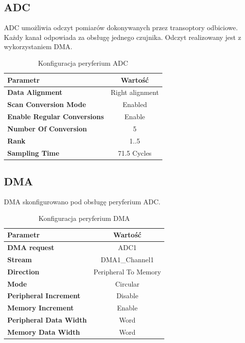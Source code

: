 \documentclass[10pt, a4paper]{article}
\begin{document}
\subsection{ADC}
\noindent ADC umożliwia odczyt pomiarów dokonywanych przez transoptory odbiciowe. Każdy kanał odpowiada za obsługę jednego czujnika. Odczyt realizowany jest z wykorzystaniem DMA.
\begin{table}[H]
	\centering
	\begin{tabular}{|l|c|} \hline
		\textbf{Parametr} & Wartość \\
		\hline
		\hline  \textbf{Data Alignment}& Right alignment\\\hline
		\textbf{Scan Conversion Mode} & Enabled\\
		\hline
		\textbf{Enable Regular Conversions} & Enable\\
		\hline
		\textbf{Number Of Conversion} & 5\\
		\hline
		\textbf{Rank} & 1..5\\
		\hline
		\textbf{Sampling Time} & 71.5 Cycles\\
		\hline
	\end{tabular}
	\caption{Konfiguracja peryferium ADC}
	\label{tab:ADC}
\end{table}
\newpage
\subsection{DMA}
\noindent DMA skonfigurowano pod obsługę peryferium ADC. 
\begin{table}[H]
	\centering
	\begin{tabular}{|l|c|} \hline
		\textbf{Parametr} & Wartość \\
		\hline
		\hline  \textbf{DMA request}& ADC1\\\hline
		\textbf{Stream} & DMA1\_Channel1\\
		\hline
		\textbf{Direction} & Peripheral To Memory\\
		\hline
		\textbf{Mode} & Circular\\
		\hline
		\textbf{Peripheral Increment} & Disable\\
		\hline
		\textbf{Memory Increment} & Enable\\
		\hline
		\textbf{Peripheral Data Width} & Word\\
		\hline
		\textbf{Memory Data Width} & Word\\
		\hline
	\end{tabular}
	\caption{Konfiguracja peryferium DMA}
	\label{tab:DAC}
\end{table}
\end{document}
